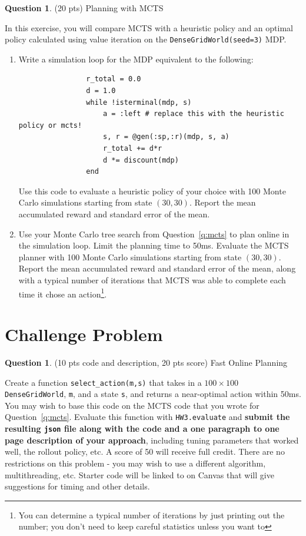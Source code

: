 \documentclass{article}
\theoremstyle{definition}
\newtheorem{question}[thm]{Question}
\begin{document}
\begin{question}
    (20 pts) Planning with MCTS

    In this exercise, you will compare MCTS with a heuristic policy and an optimal policy calculated using value iteration on the \texttt{DenseGridWorld(seed=3)} MDP.

    \begin{enumerate}[label=\alph*)]
        \item Write a simulation loop for the MDP equivalent to the following:
            \begin{verbatim}
                r_total = 0.0
                d = 1.0
                while !isterminal(mdp, s)
                    a = :left # replace this with the heuristic policy or mcts!
                    s, r = @gen(:sp,:r)(mdp, s, a)
                    r_total += d*r
                    d *= discount(mdp)
                end
            \end{verbatim} Use this code to evaluate a heuristic policy of your choice with 100 Monte Carlo simulations starting from state $(30, 30)$. Report the mean accumulated reward and standard error of the mean.
        \item Use your Monte Carlo tree search from Question~\ref{q:mcts} to plan online in the simulation loop. Limit the planning time to 50ms. Evaluate the MCTS planner with 100 Monte Carlo simulations starting from state $(30, 30)$. Report the mean accumulated reward and standard error of the mean, along with a typical number of iterations that MCTS was able to complete each time it chose an action\footnote{You can determine a typical number of iterations by just printing out the number; you don't need to keep careful statistics unless you want to}.
    \end{enumerate}


\end{question}

\section{Challenge Problem}

\begin{question}
    (10 pts code and description, 20 pts score) Fast Online Planning
    
    Create a function \texttt{select\_action(m,s)} that takes in a $100 \times 100$ \texttt{DenseGridWorld}, \texttt{m}, and a state \texttt{s}, and returns a near-optimal action within 50ms. You may wish to base this code on the MCTS code that you wrote for Question~\ref{q:mcts}. Evaluate this function with \texttt{HW3.evaluate} and \textbf{submit the resulting \texttt{json} file along with the code and a one paragraph to one page description of your approach}, including tuning parameters that worked well, the rollout policy, etc. A score of 50 will receive full credit. There are no restrictions on this problem - you may wish to use a different algorithm, multithreading, etc. Starter code will be linked to on Canvas that will give suggestions for timing and other details.
\end{question}
\end{document}
